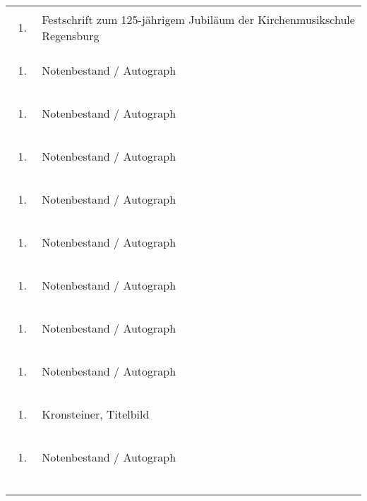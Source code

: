 \begin{flushleft}
\begin{supertabular}{m{1.2409999cm}m{14.604cm}}
\begin{enumerate}
\item
\end{enumerate}
 &
Festschrift zum 125-jährigem Jubiläum der Kirchenmusikschule
Regensburg\\
\begin{enumerate}
\item
\end{enumerate}
 &
Notenbestand / Autograph\\
\begin{enumerate}
\item
\end{enumerate}
 &
Notenbestand / Autograph\\
\begin{enumerate}
\item
\end{enumerate}
 &
Notenbestand / Autograph\\
\begin{enumerate}
\item
\end{enumerate}
 &
Notenbestand / Autograph\\
\begin{enumerate}
\item
\end{enumerate}
 &
Notenbestand / Autograph\\
\begin{enumerate}
\item
\end{enumerate}
 &
Notenbestand / Autograph\\
\begin{enumerate}
\item
\end{enumerate}
 &
Notenbestand / Autograph\\
\begin{enumerate}
\item
\end{enumerate}
 &
Notenbestand / Autograph\\
\begin{enumerate}
\item
\end{enumerate}
 &
Kronsteiner, Titelbild\\
\begin{enumerate}
\item
\end{enumerate}
 &
Notenbestand / Autograph\\
\begin{enumerate}

\end{enumerate}
\end{supertabular}
\end{flushleft}
